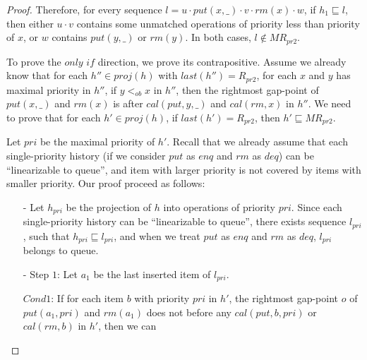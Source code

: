 \begin {proof}
Therefore, for every sequence $l = u \cdot \textit{put}(x,\_) \cdot v \cdot \textit{rm}(x) \cdot w$, if $h_1 \sqsubseteq l$, then either $u \cdot v$ contains some unmatched operations of priority less than priority of $x$, or $w$ contains $\textit{put}(y,\_)$ or $\textit{rm}(y)$. In both cases, $l \notin \textit{MR}_{\textit{pr2}}$.

To prove the $\textit{only if}$ direction, we prove its contrapositive. Assume we already know that for each $h'' \in \textit{proj}(h)$ with $\textit{last}(h'') = R_{\textit{pr2}}$, for each $x$ and $y$ has maximal priority in $h''$, if $y <_{\textit{ob}} x$ in $h''$, then the rightmost gap-point of $\textit{put}(x,\_)$ and $\textit{rm}(x)$ is after $\textit{cal}(\textit{put},y,\_)$ and $\textit{cal}(\textit{rm},x)$ in $h''$. We need to prove that for each $h' \in \textit{proj}(h)$, if $\textit{last}(h') = R_{\textit{pr2}}$, then $h' \sqsubseteq \textit{MR}_{\textit{pr2}}$.

Let $\textit{pri}$ be the maximal priority of $h'$. Recall that we already assume that each single-priority history (if we consider $\textit{put}$ as $\textit{enq}$ and $\textit{rm}$ as $\textit{deq}$) can be ``linearizable to queue'', and item with larger priority is not covered by items with smaller priority. Our proof proceed as follows:

\begin{itemize}
\setlength{\itemsep}{0.5pt}
\item[-] Let $h_{\textit{pri}}$ be the projection of $h$ into operations of priority $\textit{pri}$. Since each single-priority history can be ``linearizable to queue'', there exists sequence $l_{\textit{pri}}$, such that $h_{\textit{pri}} \sqsubseteq l_{\textit{pri}}$, and when we treat $\textit{put}$ as $\textit{enq}$ and $\textit{rm}$ as $\textit{deq}$, $l_{\textit{pri}}$ belongs to queue.

\item[-] Step $1$: Let $a_1$ be the last inserted item of $l_{\textit{pri}}$.

$\textit{Cond1}$: If for each item $b$ with priority $\textit{pri}$ in $h'$, the rightmost gap-point $o$ of $\textit{put}(a_1,\textit{pri})$ and $\textit{rm}(a_1)$ does not before any $\textit{cal}(\textit{put},b,\textit{pri})$ or $\textit{cal}(\textit{rm},b)$ in $h'$, then we can


\end{itemize}
\end{proof}
